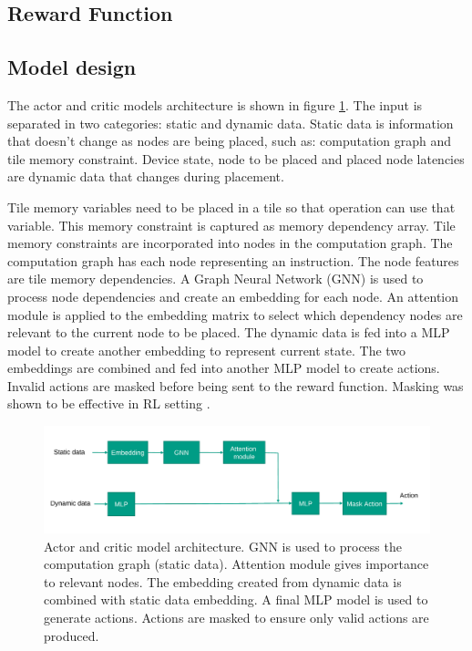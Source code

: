 \subsection{Reward Function}





\subsection{Model design}

The actor and critic models architecture is shown in figure \ref{fig:model}. 
The input is separated in two categories: static and dynamic data. 
Static data is information that doesn't change as nodes are being placed, such as: computation graph and tile memory constraint.
Device state, node to be placed and placed node latencies are dynamic data that changes during placement.

Tile memory variables need to be placed in a tile so that operation can use that variable. 
This memory constraint is captured as memory dependency array. 
Tile memory constraints are incorporated into nodes in the computation graph. 
The computation graph has each node representing an instruction. 
The node features are tile memory dependencies. 
A Graph Neural Network (GNN) is used to process node dependencies and create an embedding for each node. 
An attention module is applied to the embedding matrix to select which dependency nodes are relevant to the current node to be placed. The dynamic data is fed into a MLP model to 
create another embedding to represent current state. 
The two embeddings are combined and fed into another MLP model to 
create actions. 
Invalid actions are masked before being sent to the reward function. Masking was shown to be effective in RL setting \cite{Shengyi_mask}.

\begin{figure}[h]
  \centering
  \includegraphics[width=\linewidth]{fig/model.pdf}
  \caption{Actor and critic model architecture. GNN is used to process the computation graph (static data). 
  Attention module gives importance to relevant nodes. The embedding created from dynamic data is combined with static data embedding. 
  A final MLP model is used to generate actions. Actions are masked to ensure only valid actions are produced. }
  \label{fig:model}
\end{figure}

